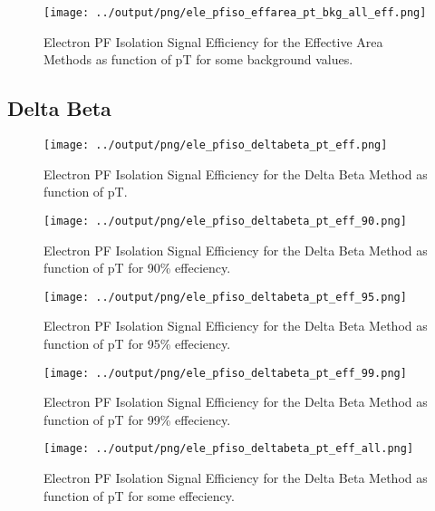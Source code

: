 \documentclass[11pt]{book}
\begin{document}
\begin{figure}[htb]
\centering
\texttt{[image: ../output/png/ele\_pfiso\_effarea\_pt\_bkg\_all\_eff.png]}
\caption{Electron PF Isolation Signal Efficiency for the Effective Area Methods as function of pT for some background values.}
\label{fig:ele_pfiso_pt_bkg_effarea_bkg_all_eff}
\end{figure}
\clearpage

\subsection{Delta Beta}
\begin{figure}[htb]
\centering
\texttt{[image: ../output/png/ele\_pfiso\_deltabeta\_pt\_eff.png]}
\caption{Electron PF Isolation Signal Efficiency for the Delta Beta Method as function of pT.}
\label{fig:ele_pfiso_pt_eff_deltabeta}
\end{figure}

\begin{figure}[htb]
\centering
\texttt{[image: ../output/png/ele\_pfiso\_deltabeta\_pt\_eff\_90.png]}
\caption{Electron PF Isolation Signal Efficiency for the Delta Beta Method as function of pT for 90\% effeciency.}
\label{fig:ele_pfiso_pt_eff_deltabeta_eff_90}
\end{figure}

\begin{figure}[htb]
\centering
\texttt{[image: ../output/png/ele\_pfiso\_deltabeta\_pt\_eff\_95.png]}
\caption{Electron PF Isolation Signal Efficiency for the Delta Beta Method as function of pT for 95\% effeciency.}
\label{fig:ele_pfiso_pt_eff_deltabeta_eff_95}
\end{figure}

\begin{figure}[htb]
\centering
\texttt{[image: ../output/png/ele\_pfiso\_deltabeta\_pt\_eff\_99.png]}
\caption{Electron PF Isolation Signal Efficiency for the Delta Beta Method as function of pT for 99\% effeciency.}
\label{fig:ele_pfiso_pt_eff_deltabeta_eff_99}
\end{figure}

\begin{figure}[htb]
\centering
\texttt{[image: ../output/png/ele\_pfiso\_deltabeta\_pt\_eff\_all.png]}
\caption{Electron PF Isolation Signal Efficiency for the Delta Beta Method as function of pT for some effeciency.}
\label{fig:ele_pfiso_pt_eff_deltabeta_eff_all}
\end{figure}
\end{document}
